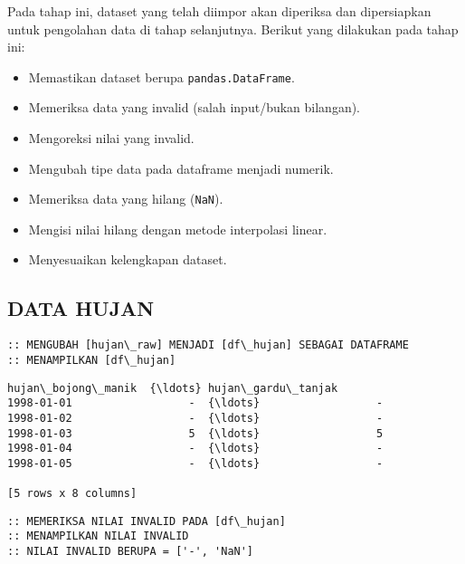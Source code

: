 \documentclass[11pt]{article}
\makeatletter
\providecommand{\tightlist}{%
      \setlength{\itemsep}{0pt}\setlength{\parskip}{0pt}}
\newcommand{\boxspacing}{\kern\kvtcb@left@rule\kern\kvtcb@boxsep}
\newcommand{\prompt}[4]{
        \ttfamily\llap{{\color{#2}[#3]:\hspace{3pt}#4}}\vspace{-\baselineskip}
    }
\makeatother
\begin{document}
Pada tahap ini, dataset yang telah diimpor akan diperiksa dan
dipersiapkan untuk pengolahan data di tahap selanjutnya. Berikut yang
dilakukan pada tahap ini:

\begin{itemize}
\tightlist
\item
  Memastikan dataset berupa \texttt{pandas.DataFrame}.
\item
  Memeriksa data yang invalid (salah input/bukan bilangan).
\item
  Mengoreksi nilai yang invalid.
\item
  Mengubah tipe data pada dataframe menjadi numerik.
\item
  Memeriksa data yang hilang (\texttt{NaN}).
\item
  Mengisi nilai hilang dengan metode interpolasi linear.
\item
  Menyesuaikan kelengkapan dataset.
\end{itemize}

    \hypertarget{data-hujan}{%
\subsection{DATA HUJAN}\label{data-hujan}}

    \begin{Verbatim}[commandchars=\\\{\}]
:: MENGUBAH [hujan\_raw] MENJADI [df\_hujan] SEBAGAI DATAFRAME
:: MENAMPILKAN [df\_hujan]
    \end{Verbatim}

            \begin{tcolorbox}[breakable, size=fbox, boxrule=.5pt, pad at break*=1mm, opacityfill=0]
\prompt{Out}{outcolor}{14}{\boxspacing}
\begin{Verbatim}[commandchars=\\\{\}]
           hujan\_bojong\_manik  {\ldots} hujan\_gardu\_tanjak
1998-01-01                  -  {\ldots}                  -
1998-01-02                  -  {\ldots}                  -
1998-01-03                  5  {\ldots}                  5
1998-01-04                  -  {\ldots}                  -
1998-01-05                  -  {\ldots}                  -

[5 rows x 8 columns]
\end{Verbatim}
\end{tcolorbox}
        
    \begin{Verbatim}[commandchars=\\\{\}]
:: MEMERIKSA NILAI INVALID PADA [df\_hujan]
:: MENAMPILKAN NILAI INVALID
:: NILAI INVALID BERUPA = ['-', 'NaN']
    \end{Verbatim}
\end{document}
